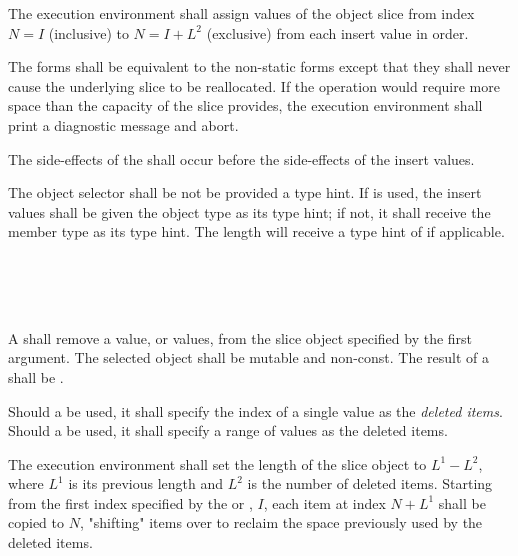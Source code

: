 \specsubsubitem
The execution environment shall assign values of the object slice from index
$N = I$ (inclusive) to $N = I+L^2$ (exclusive) from each insert value in order.

\specsubsubitem
The  forms shall be equivalent to the non-static forms except
that they shall never cause the underlying slice to be reallocated. If the
operation would require more space than the capacity of the slice provides, the
execution environment shall print a diagnostic message and abort.

\specsubsubitem
The side-effects of the  shall occur before
the side-effects of the insert values.

\specsubsubitem
The object selector shall be not be provided a type hint. If  is
used, the insert values shall be given the object type as its type hint; if
not, it shall receive the member type as its type hint. The length will receive
a type hint of  if applicable.


\begin{grammar}
 \\
	  \terminal{(}  \terminal{)} \\
	  \terminal{(}  \terminal{)} \\
\end{grammar}

\specsubsubitem
A  shall remove a value, or values, from the
slice object specified by the first argument. The selected object shall be
mutable and non-const. The result of a  shall be
.

\specsubsubitem
Should a  be used, it shall specify the index
of a single value as the \textit{deleted items}. Should a
 be used, it shall specify a range of values as
the deleted items.

\specsubsubitem
The execution environment shall set the length of the slice object to $L^1-L^2$,
where $L^1$ is its previous length and $L^2$ is the number of deleted items.
Starting from the first index specified by the
 or , $I$,
each item at index $N+L^1$ shall be copied to $N$, "shifting" items over to
reclaim the space previously used by the deleted items.

